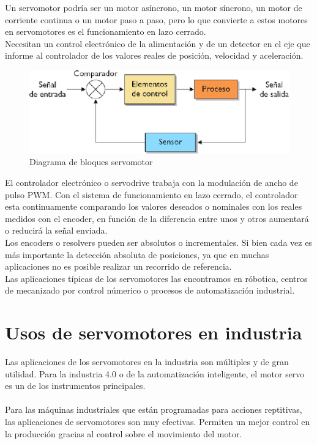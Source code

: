 \documentclass[12pt,titlepage]{article}
\begin{document}
Un servomotor podría ser un motor asíncrono, un motor síncrono, un motor de corriente continua o un motor paso a paso, pero lo que convierte a estos motores en servomotores es el funcionamiento en lazo cerrado.\\

Necesitan un control electrónico de la alimentación y de un detector en el eje que informe al controlador de los valores reales de posición, velocidad y aceleración.\\[0.8mm]

\begin{figure}[!ht]
\includegraphics[scale=0.80]{servo1}
\caption{Diagrama de bloques servomotor}
\end{figure}

El controlador electrónico o servodrive trabaja con la modulación de ancho de pulso PWM. 
Con el sistema de funcionamiento en lazo cerrado, el controlador esta continuamente comparando los valores deseados o nominales con los reales medidos con el encoder, en función de la diferencia entre unos y otros aumentará o reducirá la señal enviada. \\[0.8mm] 

Los encoders o resolvers pueden ser absolutos o incrementales. Si bien cada vez es más importante la detección absoluta de posiciones, ya que en muchas aplicaciones no es posible realizar un recorrido de referencia.\\[0.8mm]

Las aplicaciones típicas de los servomotores las encontramos en róbotica, centros de mecanizado por control númerico o procesos de automatización industrial.\\[0.8mm]

\section{Usos de servomotores en industria}
Las aplicaciones de los servomotores en la industria son múltiples y de gran utilidad. Para la industria 4.0 o de la automatización inteligente, el motor servo es un de los instrumentos principales. \\\\
Para las máquinas industriales que están programadas para acciones reptitivas, las aplicaciones de servomotores son muy efectivas. Permiten un mejor control en la producción gracias al control sobre el movimiento del motor.\\[0.8mm]
\end{document}

